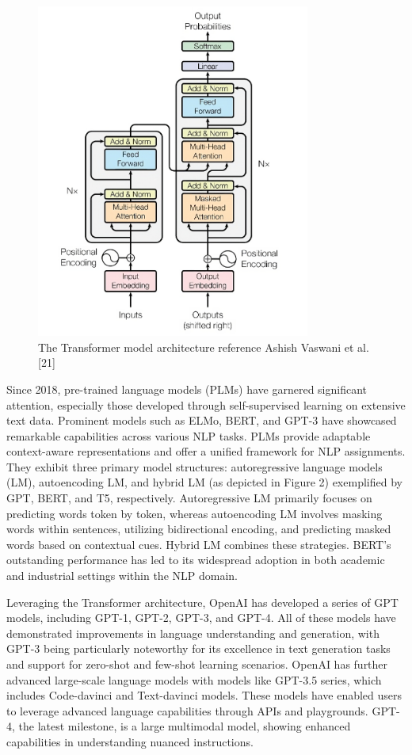 \documentclass[fleqn,10pt]{thescipub} %
\begin{document}
\begin{figure}[htp]
    \includegraphics[width=9cm]{transformer}
    \caption{The Transformer model architecture reference Ashish Vaswani et al. [21]}
    \label{fig:galaxy}
\end{figure}



Since 2018, pre-trained language models (PLMs) have garnered significant attention, especially those developed through self-supervised learning on extensive text data. Prominent models such as ELMo, BERT, and GPT-3 have showcased remarkable capabilities across various NLP tasks. PLMs provide adaptable context-aware representations and offer a unified framework for NLP assignments. They exhibit three primary model structures: autoregressive language models (LM), autoencoding LM, and hybrid LM (as depicted in Figure 2) exemplified by GPT, BERT, and T5, respectively. Autoregressive LM primarily focuses on predicting words token by token, whereas autoencoding LM involves masking words within sentences, utilizing bidirectional encoding, and predicting masked words based on contextual cues. Hybrid LM combines these strategies. BERT's outstanding performance has led to its widespread adoption in both academic and industrial settings within the NLP domain.

Leveraging the Transformer architecture, OpenAI has developed a series of GPT models, including GPT-1, GPT-2, GPT-3, and GPT-4. All of these models have demonstrated improvements in language understanding and generation, with GPT-3 being particularly noteworthy for its excellence in text generation tasks and support for zero-shot and few-shot learning scenarios. OpenAI has further advanced large-scale language models with models like GPT-3.5 series, which includes Code-davinci and Text-davinci models. These models have enabled users to leverage advanced language capabilities through APIs and playgrounds. GPT-4, the latest milestone, is a large multimodal model, showing enhanced capabilities in understanding nuanced instructions.
\end{document}
